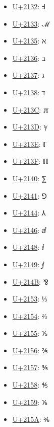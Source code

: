 \begin{itemize}
	\item \href{https://www.compart.com/en/unicode/U+2132}{U+2132}: Ⅎ
	\item \href{https://www.compart.com/en/unicode/U+2133}{U+2133}: ℳ
	\item \href{https://www.compart.com/en/unicode/U+2135}{U+2135}: ℵ
	\item \href{https://www.compart.com/en/unicode/U+2136}{U+2136}: ℶ
	\item \href{https://www.compart.com/en/unicode/U+2137}{U+2137}: ℷ
	\item \href{https://www.compart.com/en/unicode/U+2138}{U+2138}: ℸ
	\item \href{https://www.compart.com/en/unicode/U+213C}{U+213C}: ℼ
	\item \href{https://www.compart.com/en/unicode/U+213D}{U+213D}: ℽ
	\item \href{https://www.compart.com/en/unicode/U+213E}{U+213E}: ℾ
	\item \href{https://www.compart.com/en/unicode/U+213F}{U+213F}: ℿ
	\item \href{https://www.compart.com/en/unicode/U+2140}{U+2140}: ⅀
	\item \href{https://www.compart.com/en/unicode/U+2141}{U+2141}: ⅁
	\item \href{https://www.compart.com/en/unicode/U+2144}{U+2144}: ⅄
	\item \href{https://www.compart.com/en/unicode/U+2146}{U+2146}: ⅆ
	\item \href{https://www.compart.com/en/unicode/U+2148}{U+2148}: ⅈ
	\item \href{https://www.compart.com/en/unicode/U+2149}{U+2149}: ⅉ
	\item \href{https://www.compart.com/en/unicode/U+214B}{U+214B}: ⅋
	\item \href{https://www.compart.com/en/unicode/U+2153}{U+2153}: ⅓
	\item \href{https://www.compart.com/en/unicode/U+2154}{U+2154}: ⅔
	\item \href{https://www.compart.com/en/unicode/U+2155}{U+2155}: ⅕
	\item \href{https://www.compart.com/en/unicode/U+2156}{U+2156}: ⅖
	\item \href{https://www.compart.com/en/unicode/U+2157}{U+2157}: ⅗
	\item \href{https://www.compart.com/en/unicode/U+2158}{U+2158}: ⅘
	\item \href{https://www.compart.com/en/unicode/U+2159}{U+2159}: ⅙
	\item \href{https://www.compart.com/en/unicode/U+215A}{U+215A}: ⅚

\end{itemize}
